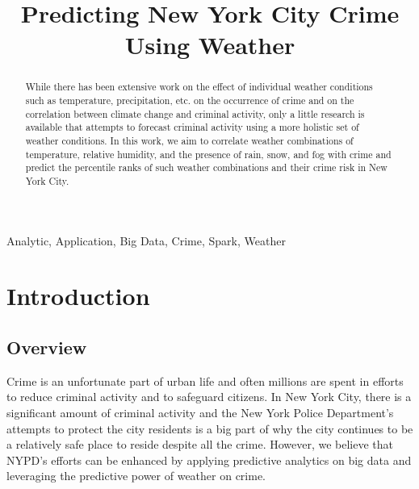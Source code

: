 \documentclass[conference]{IEEEtran}
\begin{document}
\title{Predicting New York City Crime Using Weather\\}

\author{
\and
{}
}

\maketitle

\begin{abstract}
While there has been extensive work on the effect of individual weather conditions such as temperature, precipitation, etc. on the occurrence of crime and on the correlation between climate change and criminal activity, only a little research is available that attempts to forecast criminal activity using a more holistic set of weather conditions.
In this work, we aim to correlate weather combinations of temperature, relative humidity, and the presence of rain, snow, and fog with crime and predict the percentile ranks of such weather combinations and their crime risk in New York City.
\end{abstract}

\begin{IEEEkeywords}
Analytic, Application, Big Data, Crime, Spark, Weather
\end{IEEEkeywords}

\section{Introduction}
\subsection{Overview}
Crime is an unfortunate part of urban life and often millions are spent in efforts to reduce criminal activity and to safeguard citizens.
In New York City, there is a significant amount of criminal activity and the New York Police Department's attempts to protect the city residents is a big part of why the city continues to be a relatively safe place to reside despite all the crime.
However, we believe that NYPD's efforts can be enhanced by applying predictive analytics on big data and leveraging the predictive power of weather on crime.
\end{document}
